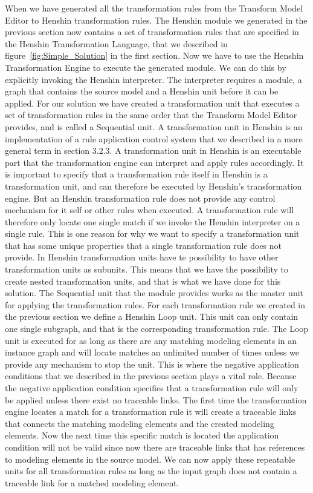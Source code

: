 When we have generated all the transformation rules from the Transform Model
Editor to Henshin transformation rules. The Henshin module we generated in the
previous section now contains a set of transformation rules that are specified
in the Henshin Transformation Language, that we described in 
figure~\ref{fig:Simple_Solution} in the first section. Now we have to use the
Henshin Transformation Engine to execute the generated module. We can do this by
explicitly invoking the Henshin interpreter. The interpreter requires a
module, a graph that contains the source model and a Henshin unit before it can be
applied. For our solution we have created a transformation unit that
executes a set of transformation rules in the same order that the Transform
Model Editor provides, and is called a Sequential unit. A transformation unit
in Henshin is an implementation of a rule application control system that we
described in a more general term in section 3.2.3. A transformation unit in
Henshin is an executable part that the transformation engine can interpret and
apply rules accordingly. It is important to specify that a transformation rule
itself in Henshin is a transformation unit, and can therefore be executed by
Henshin's transformation engine. But an Henshin transformation rule does not
provide any control mechanism for it self or other rules when executed.
A transformation rule will therefore only locate one single match if we
invoke the Henshin interpreter on a single rule. This is one reason for why we want to
specify a transformation unit that has some unique properties that a single
transformation rule does not provide. In Henshin transformation units have te
possibility to have other transformation units as subunits.
This means that we have the possibility to create nested transformation units,
and that is what we have done for this solution. The Sequential unit that the
module provides works as the master unit for applying the transformation rules.
For each transformation rule we created in the previous section we define a
Henshin Loop unit. This unit can only contain one single subgraph, and that is
the corresponding transformation rule. The Loop unit is executed for as long as
there are any matching modeling elements in an instance graph and will locate 
matches an unlimited number of times unless we provide any mechanism to stop
the unit. This is where the negative application conditions that we described
in the previous section plays a vital role. Because the negative application
condition specifies that a transformation rule will only be applied unless
there exist no traceable links. The first time the transformation engine
locates a match for a transformation rule it will create a traceable links that
connects the matching modeling elements and the created modeling elements. Now
the next time this specific match is located the application condition will not
be valid since now there are traceable links that has references to modeling
elements in the source model. We can now apply these repeatable units for all
transformation rules as long as the input graph does not contain a traceable
link for a matched modeling element. 

